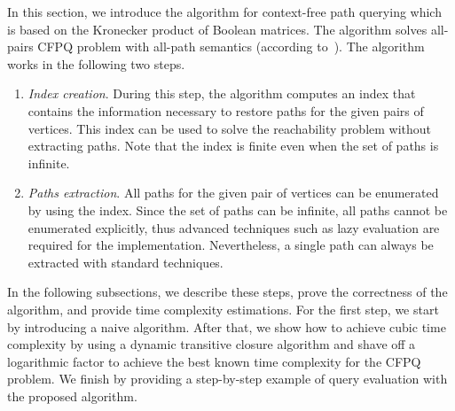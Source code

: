 
In this section, we introduce the algorithm for context-free path querying which is based on the Kronecker product of Boolean matrices.
The algorithm solves all-pairs CFPQ problem with all-path semantics (according to~\cite{hellingsPathQuerying}).
The algorithm works in the following two steps.
\begin{enumerate}
\item \emph{Index creation}.
 During this step, the algorithm computes an index that contains the information necessary to restore paths for the given pairs of vertices.
 This index can be used to solve the reachability problem without extracting paths.
 Note that the index is finite even when the set of paths is infinite.
\item \emph{Paths extraction}.
All paths for the given pair of vertices can be enumerated by using the index.
Since the set of paths can be infinite, all paths cannot be enumerated explicitly, thus advanced techniques such as lazy evaluation are required for the implementation.
Nevertheless, a single path can always be extracted with standard techniques.
\end{enumerate}

In the following subsections, we describe these steps, prove the correctness of the algorithm, and provide time complexity estimations.
For the first step, we start by introducing a naive algorithm.
After that, we show how to achieve cubic time complexity by using a dynamic transitive closure algorithm and shave off a logarithmic factor to achieve the best known time complexity for the CFPQ problem.
We finish by providing a step-by-step example of query evaluation with the proposed algorithm.



